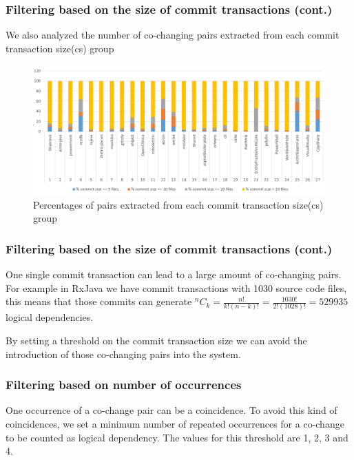 \documentclass{beamer}
\newcommand*{\Comb}[2]{{}^{#1}C_{#2}}%
\begin{document}
 \begin{frame}
\frametitle{Filtering based on the size of commit transactions (cont.)}

We also analyzed the number of co-changing pairs extracted from each commit transaction size(cs) group

\begin{center}
     \begin{figure}
	\includegraphics[width=\textwidth]{ld_distribution.png}
	\caption{\label{fig:fig1} Percentages of pairs extracted from each commit transaction size(cs) group}
     \end{figure}
\end{center}
\end{frame}

 \begin{frame}
\frametitle{Filtering based on the size of commit transactions (cont.)}

One single commit transaction can lead to a large amount of co-changing pairs. 
 \vskip 0.3cm 
For example in RxJava we have commit transactions with 1030 source code files, this means that those commits can generate 
$\Comb{n}{k}=\frac{n!}{k!(n-k)!} = \frac{1030!}{2!(1028)!} = 529 935$ logical dependencies.
 \vskip 0.3cm 

 By setting a threshold on the commit transaction size we can avoid the introduction of those co-changing pairs into the system.

\end{frame}

 \begin{frame}
\frametitle{Filtering based on number of occurrences}
One occurrence of a co-change pair can be a coincidence. To avoid this kind of coincidences, we set a minimum number of
repeated occurrences for a co-change to be counted as logical dependency. The values for this threshold are 1,
2, 3 and 4.

\end{frame}
\end{document}
